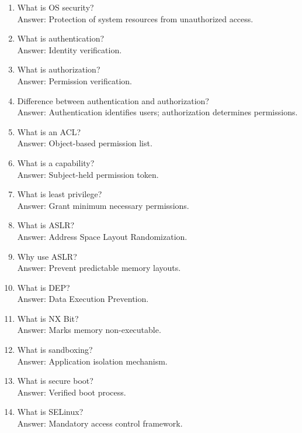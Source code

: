 \begin{enumerate}
\item What is OS security?\\
Answer: Protection of system resources from unauthorized access.

\item What is authentication?\\
Answer: Identity verification.

\item What is authorization?\\
Answer: Permission verification.

\item Difference between authentication and authorization?\\
Answer: Authentication identifies users; authorization determines permissions.

\item What is an ACL?\\
Answer: Object-based permission list.

\item What is a capability?\\
Answer: Subject-held permission token.

\item What is least privilege?\\
Answer: Grant minimum necessary permissions.

\item What is ASLR?\\
Answer: Address Space Layout Randomization.

\item Why use ASLR?\\
Answer: Prevent predictable memory layouts.

\item What is DEP?\\
Answer: Data Execution Prevention.

\item What is NX Bit?\\
Answer: Marks memory non-executable.

\item What is sandboxing?\\
Answer: Application isolation mechanism.

\item What is secure boot?\\
Answer: Verified boot process.

\item What is SELinux?\\
Answer: Mandatory access control framework.


\end{enumerate}

